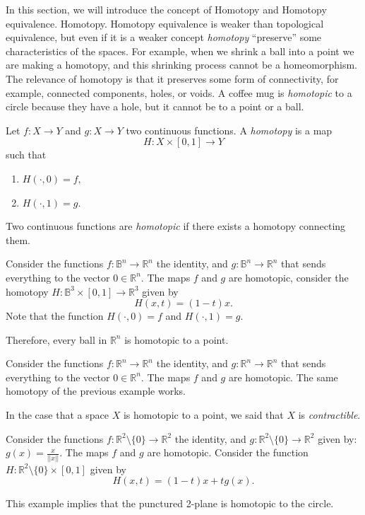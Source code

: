 \documentclass[
	fontsize=10pt, %
	twoside=false, %
	secnumdepth=1, %
]{kaobook}
\begin{document}
In this section, we will introduce the concept of Homotopy and Homotopy equivalence. Homotopy. Homotopy equivalence is weaker than topological equivalence, but even if it is a weaker concept \emph{homotopy} ``preserve'' some characteristics of the spaces. For example, when we shrink a ball into a point we are making a homotopy, and this shrinking process cannot be a homeomorphism. The relevance of homotopy is that it preserves some form of connectivity, for example, connected components, holes, or voids. A coffee mug is \emph{homotopic} to a circle because they have a hole, but it cannot be to a point or a ball.

\begin{definition}
Let $f: X\to Y$ and $g: X\to Y$ two continuous functions. A \emph{homotopy} is a map $$H: X\times[0,1]\to Y$$ such that 
\begin{enumerate}
\item $H(\cdot, 0)=f,$
\item $H(\cdot,1)=g.$
\end{enumerate}

Two continuous functions are \emph{homotopic} if there exists a homotopy connecting them.
\end{definition} 

\begin{example}
Consider the functions $f: \mathbb{B}^n\to \mathbb{R}^n$ the identity, and $g: \mathbb{B}^n\to\mathbb{R}^n$ that sends everything to the vector $0\in\mathbb{R}^n.$ The maps $f$ and $g$ are homotopic, consider the homotopy $H: \mathbb{B}^3\times[0,1]\to \mathbb{R}^3$ given by $$H(x,t)=(1-t)x.$$ Note that the function $H(\cdot,0)=f$ and $H(\cdot,1)=g.$ 

Therefore, every ball in $\mathbb{R}^n$ is homotopic to a point.
\end{example}

\begin{example}
Consider the functions $f:\mathbb{R}^n\to\mathbb{R}^n$ the identity, and $g:\mathbb{R}^n\to\mathbb{R}^n$ that sends everything to the vector $0\in\mathbb{R}^n.$ The maps $f$ and $g$ are homotopic. The same homotopy of the previous example works. 

In the case that a space $X$ is homotopic to a point, we said that $X$ is \emph{contractible}.
\end{example}

\begin{example}
Consider the functions $f: \mathbb{R}^2 \setminus\{0\} \to \mathbb{R}^2$ the identity, and $g: \mathbb{R}^2\setminus\{0\}\to\mathbb{R}^2$ given by: $g(x)=\frac{x}{||x||}$. The maps $f$ and $g$ are homotopic. Consider the function $H:\mathbb{R}^2\setminus\{0\} \times [0,1]$ given by $$H(x,t)=(1-t)x+tg(x).$$

This example implies that the punctured 2-plane is homotopic to the circle.
\end{example}
\end{document}
